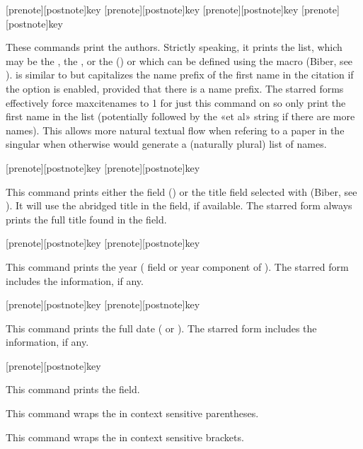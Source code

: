 \documentclass{ltxdockit}[2011/03/25]
\newcommand*{\biber}{Biber\xspace}
\begin{document}
\begin{ltxsyntax}

[prenote][postnote]{key}
[prenote][postnote]{key}
[prenote][postnote]{key}
[prenote][postnote]{key}

These commands print the authors. Strictly speaking, it prints the  list, which may be the , the , or the  (\bibtex) or which can be defined using the  macro (\biber, see ).  is similar to  but capitalizes the name prefix of the first name in the citation if the  option is enabled, provided that there is a name prefix. The starred forms effectively force maxcitenames to 1 for just this command on so only print the first name in the  list (potentially followed by the «et al» string if there are more names). This allows more natural textual flow when refering to a paper in the singular when otherwise  would generate a (naturally plural) list of names.

[prenote][postnote]{key}
[prenote][postnote]{key}

This command prints either the  field (\bibtex) or the title field selected with  (\biber, see ). It will use the abridged title in the  field, if available. The starred form always prints the full title found in the  field.

[prenote][postnote]{key}
[prenote][postnote]{key}

This command prints the year ( field or year component of ). The starred form includes the  information, if any.

[prenote][postnote]{key}
[prenote][postnote]{key}

This command prints the full date ( or ). The starred form includes the  information, if any.

[prenote][postnote]{key}

This command prints the  field.


This command wraps the  in context sensitive parentheses.


This command wraps the  in context sensitive brackets.

\end{ltxsyntax}
\end{document}
